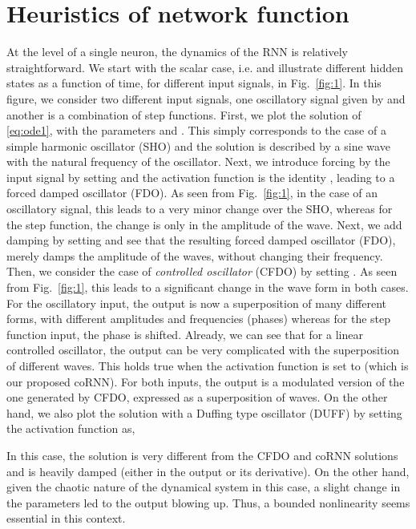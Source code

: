 \documentclass{article} \usepackage{iclr2021_conference,times}
\newcommand{\fref}[1] {Fig.~\ref{#1}}
\begin{document}
\section{Heuristics of network function}
\label{app:heuristics}
At the level of a single neuron, the dynamics of the RNN is relatively straightforward. We start with the scalar case, i.e.  and illustrate different hidden states  as a function of time, for different input signals, in \fref{fig:1}. In this figure, we consider two different input signals, one oscillatory signal given by  and another is a combination of step functions. First, we plot the solution  of \eqref{eq:ode1}, with the parameters  and . This simply corresponds to the case of a simple harmonic oscillator (SHO) and the solution is described by a sine wave with the natural frequency of the oscillator. Next, we introduce forcing by the input signal by setting  and the activation function is the identity , leading to a forced damped oscillator (FDO). As seen from \fref{fig:1}, in the case of an oscillatory signal, this leads to a very minor change over the SHO, whereas for the step function, the change is only in the amplitude of the wave. Next, we add damping by setting  and see that the resulting forced damped oscillator (FDO), merely damps the amplitude of the waves, without changing their frequency. Then, we consider the case of \emph{controlled oscillator} (CFDO) by setting . As seen from \fref{fig:1}, this leads to a significant change in the wave form in both cases. For the oscillatory input, the output is now a superposition of many different forms, with different amplitudes and frequencies (phases) whereas for the step function input, the phase is shifted. Already, we can see that for a linear controlled oscillator, the output can be very complicated with the superposition of different waves. This holds true when the activation function is set to  (which is our proposed coRNN). For both inputs, the output is a modulated version of the one generated by CFDO, expressed as a superposition of waves. On the other hand, we also plot the solution with a Duffing type oscillator (DUFF) by setting the activation function as,

In this case, the solution is very different from the CFDO and coRNN solutions and is heavily damped (either in the output or its derivative). On the other hand, given the chaotic nature of the dynamical system in this case, a slight change in the parameters led to the output blowing up. Thus, a bounded nonlinearity seems essential in this context. 
\end{document}
